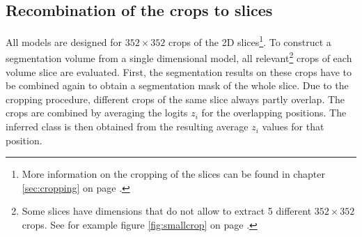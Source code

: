 \subsection{Recombination of the crops to slices}
All models are designed for $352 \times 352$ crops of the 2D slices\footnote{More information on the cropping of the slices can be found in chapter \ref{sec:cropping} on page \pageref{sec:cropping}.}.
To construct a segmentation volume from a single dimensional model, all relevant\footnote{Some slices have dimensions that do not allow to extract 5 different $352 \times 352$ crops. See for example figure \ref{fig:smallcrop} on page \pageref{fig:smallcrop}.} crops of each volume slice are evaluated.
First, the segmentation results on these crops have to be combined again to obtain a segmentation mask of the whole slice.
Due to the cropping procedure, different crops of the same slice always partly overlap.
The crops are combined by averaging the logits $z_i$ for the overlapping positions.
The inferred class is then obtained from the resulting average $z_i$ values for that position. 

